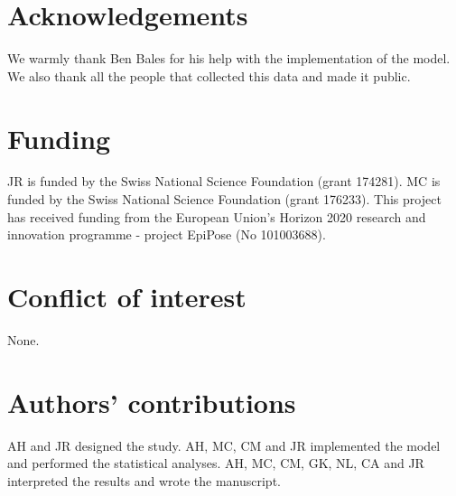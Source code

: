 \documentclass{article}
\begin{document}

  


\section*{Acknowledgements}

We warmly thank Ben Bales for his help with the implementation of the model. We also thank all the people that collected this data and made it public.

\section*{Funding}

JR is funded by the Swiss National Science Foundation (grant 174281). MC is funded by the Swiss National Science Foundation (grant 176233). This project has received funding from the European Union's Horizon 2020 research and innovation programme - project EpiPose (No 101003688).

\section*{Conflict of interest}

None.

\section*{Authors' contributions}

AH and JR designed the study. 
AH, MC, CM and JR implemented the model and performed the statistical analyses. 
AH, MC, CM, GK, NL, CA and JR interpreted the results and wrote the manuscript.
\end{document}
